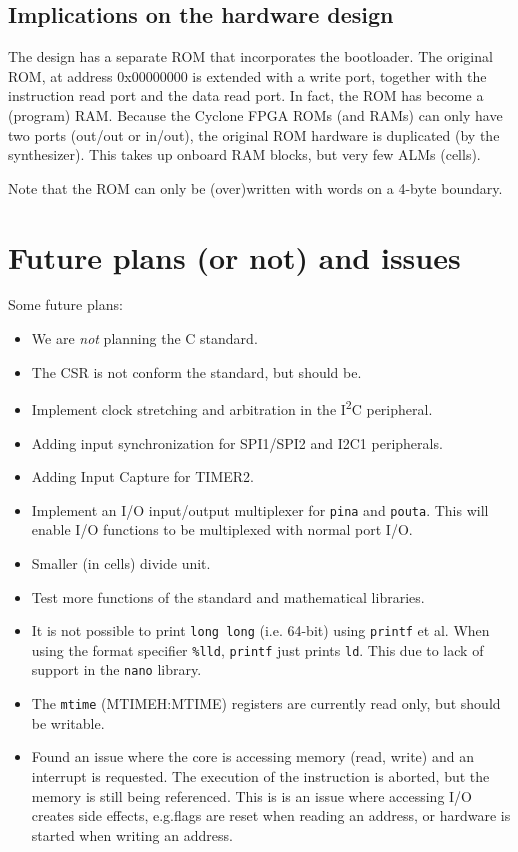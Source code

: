 \documentclass[12pt]{article}
\begin{document}
\subsection{Implications on the hardware design}
The design has a separate ROM that incorporates the bootloader. The original ROM, at address 0x00000000 is extended with a write port, together with the instruction read port and the data read port. In fact, the ROM has become a (program) RAM. Because the Cyclone FPGA ROMs (and RAMs) can only have two ports (out/out or in/out), the original ROM hardware is duplicated (by the synthesizer). This takes up onboard RAM blocks, but very few ALMs (cells). %

Note that the ROM can only be (over)written with words on a 4-byte boundary.

\section{Future plans (or not) and issues}
Some future plans:

\begin{itemize}
\item We are \emph{not} planning the C standard.
\item The CSR is not conform the standard, but should be.
\item Implement clock stretching and arbitration in the I\textsuperscript{2}C peripheral.
\item Adding input synchronization for SPI1/SPI2 and I2C1 peripherals.
\item Adding Input Capture for TIMER2.
\item Implement an I/O input/output multiplexer for \lstinline|pina| and \lstinline|pouta|. This will enable I/O functions to be multiplexed with normal port I/O.
\item Smaller (in cells) divide unit.
\item Test more functions of the standard and mathematical libraries.
\item It is not possible to print \lstinline|long long| (i.e. 64-bit) using \lstinline|printf| et al. When using the format specifier \lstinline|%lld|, \lstinline|printf| just prints \lstinline|ld|. This due to lack of support in the \lstinline|nano| library.
\item The \lstinline|mtime| (MTIMEH:MTIME) registers are currently read only, but should be writable.
\item Found an issue where the core is accessing memory (read, write) and an interrupt is requested. The execution of the instruction is aborted, but the memory is still being referenced. This is is an issue where accessing I/O creates side effects, e.g.\@ flags are reset when reading an address, or hardware is started when writing an address.
\end{itemize}
\end{document}
